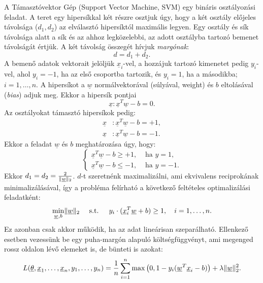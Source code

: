 A Támasztóvektor Gép \cite{cortes1995support} (Support Vector Machine, SVM) egy bináris osztályozási feladat. 
A teret egy hipersíkkal két részre osztjuk úgy, hogy a két osztály előjeles távolsága ($ d_1, d_2 $) az elválasztó hipersíktól maximális legyen. 
Egy osztály és sík távolsága alatt a sík és az ahhoz legközelebbi, az adott osztályba tartozó bemenet távolságát értjük. 
A két távolság összegét hívjuk \textit{margónak}: 
\[d = d_1 + d_2.\]
A bemenő adatok vektorait jelöljük $ \underline{x}_i $-vel, a hozzájuk tartozó kimenetet
pedig $ y_i $-vel, ahol $ y_i=-1 $, ha az első csoportba tartozik, és $ y_i=1 $, ha a másodikba; $i=1,\dots,n$.
A hipersíkot a $ \underline{w} $ normálvektorával (súlyával, weight) és $ b $ eltolásával (\textit{bias}) adjuk meg.
Ekkor a hipersík pontjai 
\[\underline{x}: \underline{x}^T \underline{w} - b = 0.\]
Az osztályokat támasztó hipersíkok pedig:
\begin{align*}
\underline{x}&\colon \underline{x}^T \underline{w} - b = +1, \\
\underline{x}&\colon \underline{x}^T \underline{w} - b = -1.
\end{align*}
Ekkor a feladat $ \underline{w} $ és $ b $ meghatározása úgy, hogy:
\[
\begin{cases}
\underline{x}^T \underline{w} - b \geq +1, & \text{ ha }  y=1, \\
\underline{x}^T \underline{w} - b \leq -1, & \text{ ha }  y=-1.
\end{cases}
\]
Ekkor $ d_1 = d_2 = \frac{2}{\lVert\underline{w}\rVert_2} $.  
$ d $-t szeretnénk maximalizálni, ami ekvivalens reciprokának minimalizálásával, így a probléma felírható a következő feltételes optimalizálási feladatként:
\[
\min\limits_{\underline{w}, b} \lVert\underline{w}\rVert_2 \quad\text{ s.t. }\quad y_i \cdot (\underline{x}_i^T \underline{w} + b) \geq 1, \quad i=1,\dots,n.
\]
Ez azonban csak akkor működik, ha az adat lineárisan szeparálható. Ellenkező esetben
vezessünk be egy puha-margón alapuló költségfüggvényt, ami megenged rossz oldalon lévő elemeket is, de bünteti is azokat:
\[
L(\underline{\theta}, \underline{x}_1, \dots, \underline{x}_n, y_1, \dots, y_n)  = \frac{1}{n} \sum\limits_{i=1}^{n} 
\max\big(0, 1 - y_i(\underline{w}^T \underline{x}_i - b)\big) + \lambda \lVert\underline{w}\rVert_2^2.
\]


